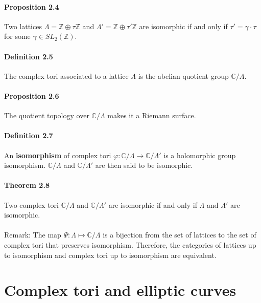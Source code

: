 \documentclass[letterpaper,10pt]{article}
\begin{document}
\paragraph{Proposition 2.4} Two lattices $\Lambda = \mathbb{Z} \oplus \tau\mathbb{Z}$ and $\Lambda' = \mathbb{Z} \oplus \tau'\mathbb{Z}$ are isomorphic if and only if
$\tau' = \gamma \cdot \tau$ for some $\gamma \in SL_2(\mathbb{Z})$.




\paragraph{Definition 2.5} The complex tori associated to a lattice $\Lambda$ is the abelian quotient group $\mathbb{C} / \Lambda$.  

\paragraph{Proposition 2.6} The quotient topology over $\mathbb{C} / \Lambda$ makes it a Riemann surface.

\paragraph{Definition 2.7} An \textbf{isomorphism} of complex tori $\varphi : \mathbb{C} / \Lambda \to \mathbb{C} / \Lambda'$ is a holomorphic 
group isomorphism. $\mathbb{C} / \Lambda$ and $\mathbb{C} / \Lambda'$ are then said to be isomorphic.

\paragraph{Theorem 2.8}  Two complex tori $\mathbb{C} / \Lambda$ and $\mathbb{C} / \Lambda'$ are isomorphic if and only if  $\Lambda$ and $\Lambda'$ are isomorphic.


{\itshape \paragraph{}Remark: The map  $\Psi: \Lambda \mapsto \mathbb{C}/\Lambda$ is  a bijection from the set of lattices to the set of complex tori that
 preserves isomorphism. Therefore, the categories of lattices up to isomorphism and complex tori up to isomorphism are equivalent.
}
\section{Complex tori and elliptic curves}%
\end{document}
